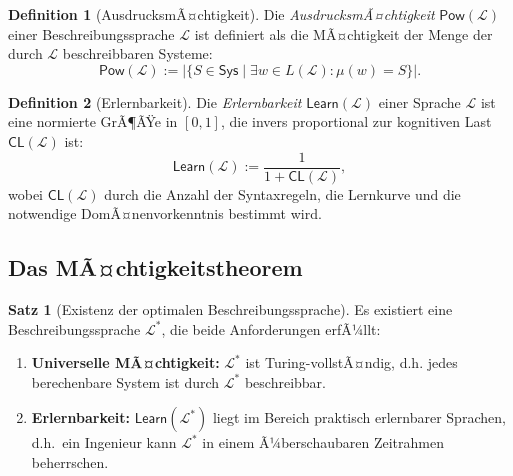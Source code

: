﻿\documentclass[a4paper,12pt]{article}
\theoremstyle{definition}
\newtheorem{definition}{Definition}
\newtheorem{satz}{Satz}
\begin{document}
\begin{definition}[AusdrucksmÃ¤chtigkeit]
\label{def:maechtigkeit}
Die \emph{AusdrucksmÃ¤chtigkeit} $\mathsf{Pow}(\mathcal{L})$ einer Beschreibungssprache
$\mathcal{L}$ ist definiert als die MÃ¤chtigkeit der Menge der durch $\mathcal{L}$
beschreibbaren Systeme:
\[
  \mathsf{Pow}(\mathcal{L}) := |\{S \in \mathsf{Sys} \mid \exists w \in L(\mathcal{L}): \mu(w) = S\}|.
\]
\end{definition}

\begin{definition}[Erlernbarkeit]
\label{def:erlernbarkeit}
Die \emph{Erlernbarkeit} $\mathsf{Learn}(\mathcal{L})$ einer Sprache $\mathcal{L}$ ist eine
normierte GrÃ¶ÃŸe in $[0, 1]$, die invers proportional zur kognitiven Last
$\mathsf{CL}(\mathcal{L})$ ist:
\[
  \mathsf{Learn}(\mathcal{L}) := \frac{1}{1 + \mathsf{CL}(\mathcal{L})},
\]
wobei $\mathsf{CL}(\mathcal{L})$ durch die Anzahl der Syntaxregeln, die
Lernkurve und die notwendige DomÃ¤nenvorkenntnis bestimmt wird.
\end{definition}

\subsection{Das MÃ¤chtigkeitstheorem}

\begin{satz}[Existenz der optimalen Beschreibungssprache]
\label{satz:optsprache}
Es existiert eine Beschreibungssprache $\mathcal{L}^*$, die beide Anforderungen erfÃ¼llt:
\begin{enumerate}
  \item \textbf{Universelle MÃ¤chtigkeit:} $\mathcal{L}^*$ ist Turing-vollstÃ¤ndig, d.h.
        jedes berechenbare System ist durch $\mathcal{L}^*$ beschreibbar.
  \item \textbf{Erlernbarkeit:} $\mathsf{Learn}(\mathcal{L}^*)$ liegt im Bereich
        praktisch erlernbarer Sprachen, d.h.\ ein Ingenieur kann $\mathcal{L}^*$ in
        einem Ã¼berschaubaren Zeitrahmen beherrschen.
\end{enumerate}
\end{satz}
\end{document}
